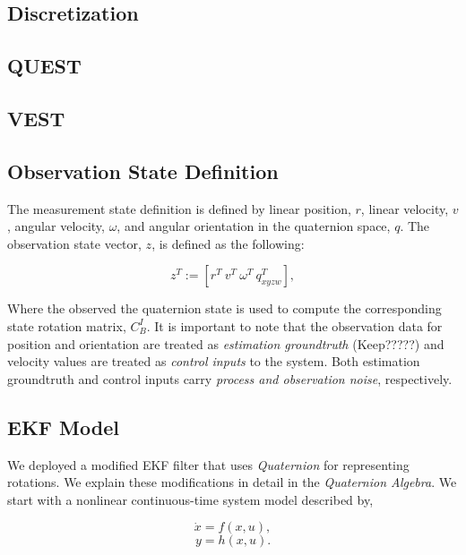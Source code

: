 \documentclass[letterpaper, 10 pt, conference]{ieeeconf}  %
\newcommand{\transpose}[1]{\ensuremath{#1^{\scriptscriptstyle T}}}
\begin{document}
\subsection{Discretization}

\subsection{QUEST}


\subsection{VEST}



\subsection{Observation State Definition}

The measurement state definition is defined by linear position, $r$, linear
velocity, $v$, angular velocity, $\omega$, and angular orientation in the quaternion
space, $q$. The observation state vector, $z$, is defined as the following:

\begin{equation} \label{eq:5}
\transpose{z} :=  \left[\transpose{r}~\transpose{v}~\transpose{\omega}~\transpose{q_{xyzw}} \right],
\end{equation}


Where the observed the quaternion state is used to compute the corresponding state
rotation matrix, ${C}^{I}_{B}$.
It is important to note that the observation data for position and orientation are treated as \textit{estimation groundtruth} (Keep?????) and velocity values are treated as \textit{control inputs} to the system. Both estimation groundtruth and control inputs carry \textit{process and observation noise}, respectively.




\subsection{EKF Model}

We deployed a modified EKF filter that uses \textit{Quaternion} for representing
rotations. We explain these modifications in detail in the \textit{Quaternion Algebra}.
We start with a nonlinear continuous-time system model described by,

\begin{equation} \label{eq:6}
\dot{x} = f(x,u),
\end{equation}
\begin{equation} \label{eq:7}
y = h(x,u).
\end{equation}
\end{document}
